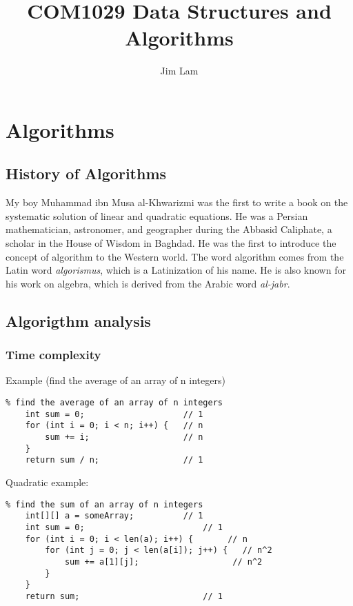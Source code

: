 \documentclass{article}
\author{Jim Lam}
\begin{document}
\title{COM1029 Data Structures and Algorithms}
\maketitle
\tableofcontents
\section{Algorithms}

\subsection{History of Algorithms}

My boy Muhammad ibn Musa al-Khwarizmi was the first to write a book on the systematic solution of linear and quadratic equations. He was a Persian mathematician, astronomer, and geographer during the Abbasid Caliphate, a scholar in the House of Wisdom in Baghdad. He was the first to introduce the concept of algorithm to the Western world. The word algorithm comes from the Latin word \textit{algorismus}, which is a Latinization of his name.
He is also known for his work on algebra, which is derived from the Arabic word \textit{al-jabr}.

\subsection{Algorigthm analysis}

\subsubsection{Time complexity}

Example (find the average of an array of n integers)

\begin{lstlisting}
% find the average of an array of n integers
    int sum = 0;                    // 1
    for (int i = 0; i < n; i++) {   // n
        sum += i;                   // n
    }
    return sum / n;                 // 1

\end{lstlisting}

Quadratic example:

\begin{lstlisting}
% find the sum of an array of n integers
    int[][] a = someArray;          // 1
    int sum = 0;                        // 1
    for (int i = 0; i < len(a); i++) {       // n
        for (int j = 0; j < len(a[i]); j++) {   // n^2
            sum += a[1][j];                   // n^2
        }
    }
    return sum;                         // 1
\end{lstlisting}
\end{document}
